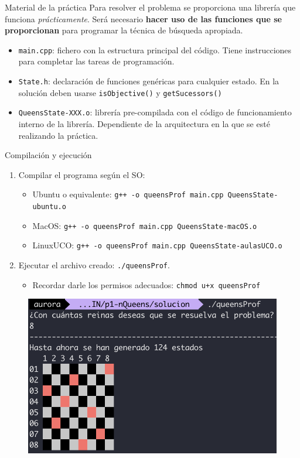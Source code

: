 \documentclass[usenames,dvipsnames,aspectratio=169]{beamer}
\begin{document}
\begin{frame}{Material de la práctica}
	Para resolver el problema se proporciona una librería que funciona \textit{prácticamente}. Será necesario \textbf{hacer uso de las funciones que se proporcionan} para programar la técnica de búsqueda apropiada.
	\begin{itemize}
		\item \texttt{main.cpp}: fichero con la estructura principal del código. Tiene instrucciones para completar las tareas de programación.
		\item \texttt{State.h}: declaración de funciones genéricas para cualquier estado. En la solución deben usarse \texttt{isObjective()} y \texttt{getSucessors()}
		\item \texttt{QueensState-XXX.o}: librería pre-compilada con el código de funcionamiento interno de la librería. Dependiente de la arquitectura en la que se esté realizando la práctica.
	\end{itemize}
\end{frame}

\begin{frame}{Compilación y ejecución}
	\begin{enumerate}
		\item Compilar el programa según el SO:
		\begin{itemize}
			\item Ubuntu o equivalente: \texttt{g++ -o queensProf main.cpp QueensState-ubuntu.o}
			\item MacOS: \texttt{g++ -o queensProf main.cpp QueensState-macOS.o}
			\item LinuxUCO: \texttt{g++ -o queensProf main.cpp QueensState-aulasUCO.o}
		\end{itemize}
		\item Ejecutar el archivo creado: \texttt{./queensProf}.
			\begin{itemize}
				\item Recordar darle los permisos adecuados: \texttt{chmod u+x queensProf}
			\end{itemize}
	\end{enumerate}
	\begin{figure}
		\centering
		\includegraphics[width=.45\linewidth]{graphics/ejecucion.png}
	\end{figure}
\end{frame}
\end{document}
